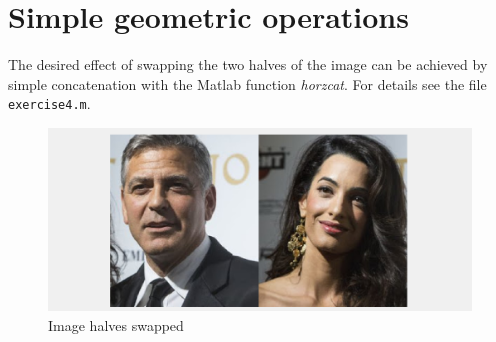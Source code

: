 \section{Simple geometric operations}

The desired effect of swapping the two halves of the image can be achieved by simple concatenation with the Matlab function \textit{horzcat}. For details see the file \texttt{exercise4.m}.

\begin{figure}[!hbt]
  \includegraphics[width=\textwidth]{./img/task18.png}
  \caption{Image halves swapped}
  \label{fig:task18}
\end{figure}